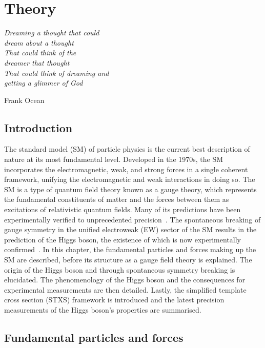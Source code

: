 \chapter{Theory}
\label{chap:theory}

\epigraph{\textit{Dreaming a thought that could ~\\
                  dream about a thought ~\\
                  That could think of the ~\\
                  dreamer that thought ~\\
                  That could think of dreaming and ~\\
                  getting a glimmer of God}
                 }{Frank Ocean}

\section{Introduction}

The standard model (SM) of particle physics is the current best description of nature 
at its most fundamental level.
Developed in the 1970s, the SM incorporates the electromagnetic, weak, 
and strong forces in a single coherent framework, 
unifying the electromagnetic and weak interactions in doing so.
The SM is a type of quantum field theory known as a gauge theory, 
which represents the fundamental constituents of matter and the forces between them
as excitations of relativistic quantum fields.
Many of its predictions have been experimentally verified to unprecedented precision~\cite{EMstuff}.
The spontaneous breaking of gauge symmetry in the unified electroweak (EW) sector of the SM
results in the prediction of the Higgs boson, 
the existence of which is now experimentally confirmed~\cite{HiggsShit}.
In this chapter, the fundamental particles and forces making up the SM are described, 
before its structure as a gauge field theory is explained.
The origin of the Higgs boson and through spontaneous symmetry breaking is elucidated.
The phenomenology of the Higgs boson and the consequences for experimental measurements 
are then detailed. 
Lastly, the simplified template cross section (STXS) framework is introduced 
and the latest precision measurements of the Higgs boson's properties are summarised.

\section{Fundamental particles and forces}

